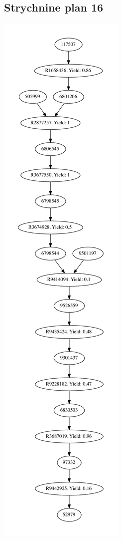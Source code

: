 \documentclass[a4paper,10pt,titlepage]{paper}
\begin{document}
\subsection{Strychnine plan 16}
\centering
\includegraphics[scale=0.4]{Synteseplaner/Strychnine/plan16.pdf}
\label{Appendix::Strychnine16}
\end{document}
